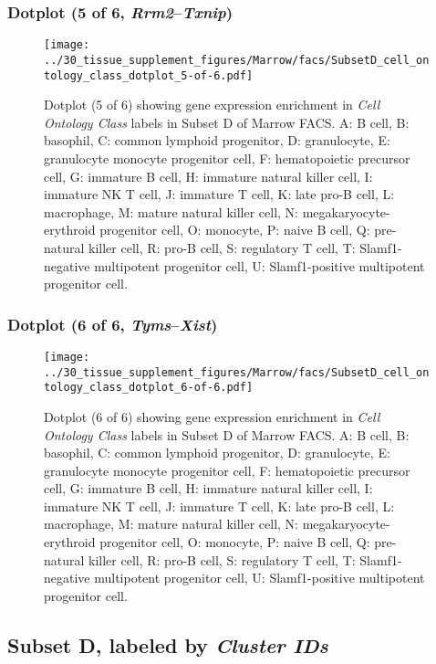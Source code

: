 \subsubsection{Dotplot (5 of 6, \emph{Rrm2}--\emph{Txnip})}
\begin{figure}[h]
\centering
\texttt{[image: ../30\_tissue\_supplement\_figures/Marrow/facs/SubsetD\_cell\_ontology\_class\_dotplot\_5-of-6.pdf]}

\caption{ Dotplot (5 of 6)  showing gene expression enrichment in \emph{Cell Ontology Class} labels in Subset D of Marrow FACS. A: B cell, B: basophil, C: common lymphoid progenitor, D: granulocyte, E: granulocyte monocyte progenitor cell, F: hematopoietic precursor cell, G: immature B cell, H: immature natural killer cell, I: immature NK T cell, J: immature T cell, K: late pro-B cell, L: macrophage, M: mature natural killer cell, N: megakaryocyte-erythroid progenitor cell, O: monocyte, P: naive B cell, Q: pre-natural killer cell, R: pro-B cell, S: regulatory T cell, T: Slamf1-negative multipotent progenitor cell, U: Slamf1-positive multipotent progenitor cell.}
\end{figure}


\clearpage

\subsubsection{Dotplot (6 of 6, \emph{Tyms}--\emph{Xist})}
\begin{figure}[h]
\centering
\texttt{[image: ../30\_tissue\_supplement\_figures/Marrow/facs/SubsetD\_cell\_ontology\_class\_dotplot\_6-of-6.pdf]}

\caption{ Dotplot (6 of 6)  showing gene expression enrichment in \emph{Cell Ontology Class} labels in Subset D of Marrow FACS. A: B cell, B: basophil, C: common lymphoid progenitor, D: granulocyte, E: granulocyte monocyte progenitor cell, F: hematopoietic precursor cell, G: immature B cell, H: immature natural killer cell, I: immature NK T cell, J: immature T cell, K: late pro-B cell, L: macrophage, M: mature natural killer cell, N: megakaryocyte-erythroid progenitor cell, O: monocyte, P: naive B cell, Q: pre-natural killer cell, R: pro-B cell, S: regulatory T cell, T: Slamf1-negative multipotent progenitor cell, U: Slamf1-positive multipotent progenitor cell.}
\end{figure}


\clearpage

\subsection{Subset D, labeled by \emph{Cluster IDs}}
